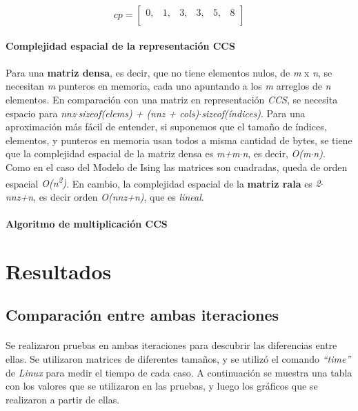 \documentclass[a4paper,11pt]{article}
\begin{document}
\[ cp = \left[ \begin{array}{cccccc}
0, & 1, & 3, & 3, & 5, & 8\\\end{array} \right]\]
\\
\textbf{Complejidad espacial de la representaci\'on CCS}
\paragraph{}
Para una \textbf{matriz densa}, es decir, que no tiene elementos nulos, de \emph{m} x \emph{n}, se necesitan \emph{m} punteros en memoria, cada uno apuntando a los \emph{m} arreglos de \emph{n} elementos. En comparaci\'on con una matriz en representaci\'on \emph{CCS}, se necesita espacio para \emph{nnz$\cdot$sizeof(elems) + (nnz + cols)$\cdot$sizeof(\'indices)}. Para una aproximaci\'on m\'as f\'acil de entender, si suponemos que el tamaño de \'indices, elementos, y punteros en memoria usan todos a misma cantidad de bytes, se tiene que la complejidad espacial de la matriz densa es \emph{m+m$\cdot$n}, es decir, \emph{O(m$\cdot$n)}. Como en el caso del Modelo de Ising las matrices son cuadradas, queda de orden espacial \emph{O(n\textsuperscript{2})}. En cambio, la complejidad espacial de la \textbf{matriz rala} es \emph{2$\cdot$nnz+n}, es decir orden \emph{O(nnz+n)}, que es \emph{lineal}.\\
\\
\textbf{Algoritmo de multiplicaci\'on CCS}
\paragraph{}
\newpage
\section{Resultados}
\subsection{Comparaci\'on entre ambas iteraciones}
\paragraph{}
Se realizaron pruebas en ambas iteraciones para descubrir las diferencias entre ellas. Se utilizaron matrices de diferentes tamaños, y se utiliz\'o el comando \emph{``time''} de \emph{Linux} para medir el tiempo de cada caso. A continuaci\'on se muestra una tabla con los valores que se utilizaron en las pruebas, y luego los gr\'aficos que se realizaron a partir de ellas.\\
\\
\end{document}
